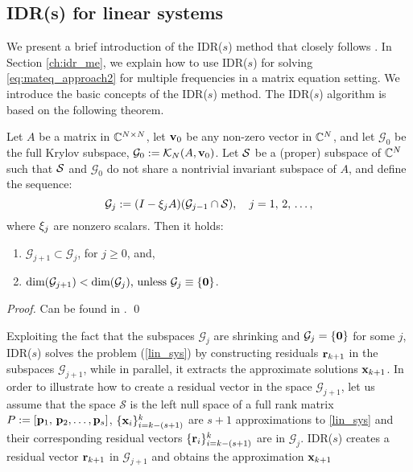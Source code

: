 \subsection{IDR(s) for linear systems}
\label{ch:idr_linsys}
We present a brief introduction of the IDR($s$) method that closely follows \cite{sg08}. 
In Section \ref{ch:idr_me}, we explain how to use IDR($s$) for solving \eqref{eq:mateq_approach2} for multiple
frequencies in a matrix equation setting. We introduce the basic concepts 
of the IDR($s$) method. The IDR($s$) algorithm is based on the following theorem.
\begin{theorem}
\label{idr_thm}
Let $A$ be a matrix in ${\mathbb{C}}^{N\times N}$,  let $\mathbf{v}_0$ be any non-zero vector in ${\mathbb{C}}^N$, 
and let $\mathcal{G}_0$ be the full Krylov subspace, $\mathcal{G}_0 := \mathcal{K}_N(A,\mathbf{v}_0)$. Let ${\mathcal{S}}$ be a 
(proper) subspace of ${\mathbb{C}}^N$ such that ${\mathcal{S}}$ and $\mathcal{G}_0$ do not share a nontrivial
invariant subspace of $A$, and define the sequence: 
\begin{equation}
\mathcal{G}_{j} := (I-{\xi}_{j}A)(\mathcal{G}_{j-1}\cap {\mathcal{S}} ),  \quad j=1,\, 2,\,\dots,
\end{equation}
where ${\xi}_j$ are nonzero scalars. Then it holds:
\begin{enumerate} 
\item $\mathcal{G}_{j+1} \subset \mathcal{G}_{j}$, for $j\geq 0$, and,  
\item $\text{dim}(\mathcal{G}_{j+1}) < \text{dim}(\mathcal{G}_{j}) \text{, unless } \mathcal{G}_{j} \equiv \{\mathbf{0}\}$. 
\end{enumerate}
\end{theorem}
\begin{proof}
 Can be found in \cite{sg08}. \qed
\end{proof}
Exploiting the fact that the subspaces $\mathcal{G}_j$ are shrinking and $\mathcal{G}_j = \{\mathbf{0}\}$ for some $j$,
IDR($s$) solves the problem (\ref{lin_sys}) by constructing residuals $\mathbf{r}_{k+1}$ in the subspaces $\mathcal{G}_{j+1}$, while in parallel,
it extracts the approximate solutions ${\mathbf{x}}_{k+1}$. 
In order to illustrate how to create a residual vector in the space $\mathcal{G}_{j+1}$,
let us assume that the space $\mathcal{S}$ is the left null space of a
full rank matrix $P:=[\mathbf{p}_1,\,\mathbf{p}_2,\dots ,\mathbf{p}_s]$, 
$\{{\mathbf{x}}_i\}_{i=k-(s+1)}^k$ are $s+1$ approximations to \eqref{lin_sys} and their corresponding residual vectors
$\{\mathbf{r}_i\}_{i=k-(s+1)}^k$ are in $\mathcal{G}_j$.  
IDR($s$) creates a residual vector $\mathbf{r}_{k+1}$ in $\mathcal{G}_{j+1}$ and obtains the approximation ${\mathbf{x}}_{k+1}$
